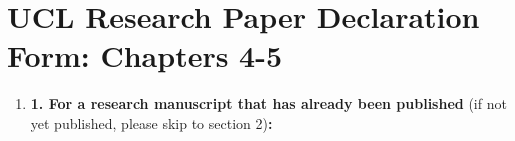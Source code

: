 \newpage	
\section*{UCL Research Paper Declaration Form: Chapters 4-5}

    \begin{enumerate}\itemsep0em
    
        \item \textbf{1.	For a research manuscript that has already been published} (if not yet published, please skip to section 2)\textbf{:}

\end{enumerate}
